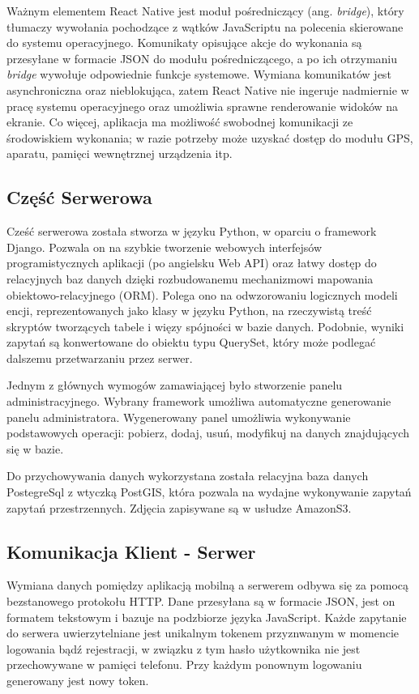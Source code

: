\documentclass[licencjacka]{pracamgr}
\begin{document}
Ważnym elementem React Native jest moduł pośredniczący (ang. \textit{bridge}), który tłumaczy wywołania pochodzące z wątków JavaScriptu na polecenia skierowane do systemu operacyjnego. Komunikaty opisujące akcje do wykonania są przesyłane w formacie JSON do modułu pośredniczącego, a po ich otrzymaniu \textit{bridge} wywołuje odpowiednie funkcje systemowe. Wymiana komunikatów jest asynchroniczna oraz nieblokująca, zatem React Native nie ingeruje nadmiernie w pracę systemu operacyjnego oraz umożliwia sprawne renderowanie widoków na ekranie. Co więcej, aplikacja ma możliwość swobodnej komunikacji ze środowiskiem wykonania; w razie potrzeby może uzyskać dostęp do modułu GPS, aparatu, pamięci wewnętrznej urządzenia itp.

\subsection{Część Serwerowa} 

Cześć serwerowa została stworza w języku Python, w oparciu o framework Django. Pozwala on na szybkie tworzenie webowych interfejsów programistycznych aplikacji (po angielsku Web API) oraz łatwy dostęp do relacyjnych baz danych dzięki rozbudowanemu mechanizmowi mapowania obiektowo-relacyjnego (ORM). Polega ono na odwzorowaniu logicznych modeli encji, reprezentowanych jako klasy w języku Python, na rzeczywistą treść skryptów tworzących tabele i więzy spójności w bazie danych. Podobnie, wyniki zapytań są konwertowane do obiektu typu QuerySet, który może podlegać dalszemu przetwarzaniu przez serwer.

Jednym z głównych wymogów zamawiającej było stworzenie panelu administracyjnego. Wybrany framework umożliwa automatyczne generowanie panelu administratora. Wygenerowany panel umożliwia wykonywanie podstawowych operacji: pobierz, dodaj, usuń, modyfikuj na danych znajdujących się w bazie. 

Do przychowywania danych wykorzystana została relacyjna baza danych PostegreSql z wtyczką PostGIS, która pozwala na wydajne wykonywanie zapytań zapytań przestrzennych. Zdjęcia zapisywane są w usłudze AmazonS3.

\subsection{Komunikacja Klient - Serwer} 
Wymiana danych pomiędzy aplikacją mobilną a serwerem odbywa się za pomocą bezstanowego protokołu HTTP. Dane przesyłana są w formacie JSON, jest on formatem tekstowym i bazuje na podzbiorze języka JavaScript. Każde zapytanie do serwera uwierzytelniane jest unikalnym tokenem przyznwanym w momencie logowania bądź rejestracji, w związku z tym hasło użytkownika nie jest przechowywane w pamięci telefonu. Przy każdym ponownym logowaniu generowany jest nowy token. 
\end{document}
